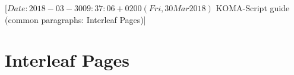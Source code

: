 %
%
%
%
%
%
%
%
% 
%
%
%
%

%
                 [$Date: 2018-03-30 09:37:06 +0200 (Fri, 30 Mar 2018) $
                  KOMA-Script guide (common paragraphs: Interleaf Pages)]


\section{Interleaf Pages}
%
\BeginIndexGroup
{}%
%

